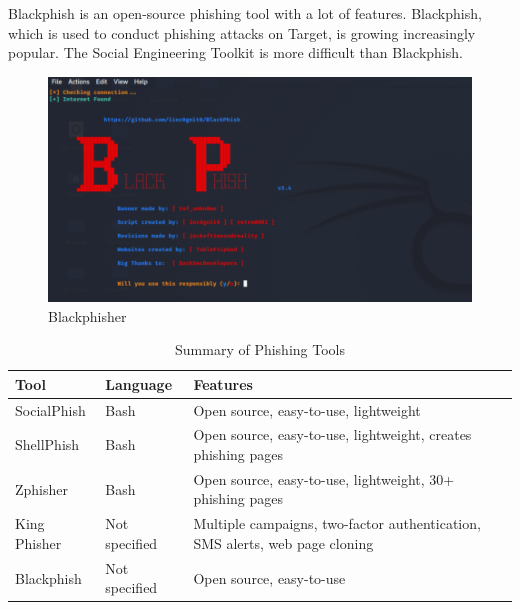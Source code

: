 \documentclass[openany]{report}
\begin{document}
Blackphish is an open-source phishing tool with a lot of features. Blackphish, which is used to conduct phishing attacks on Target, is growing increasingly popular. The Social Engineering Toolkit is more difficult than Blackphish.

\begin{figure}[H]
    \centering
    \includegraphics[width=.95\textwidth]{blackphisher.png}
    \caption{Blackphisher}
    \label{fig:blackphisher}
\end{figure}

\begin{table}[h]
    \centering
    \begin{tabular}{|l|l|l|}
        \hline
        \textbf{Tool} & \textbf{Language} & \textbf{Features}                                                           \\
        \hline
        SocialPhish   & Bash              & Open source, easy-to-use, lightweight                                       \\
        \hline
        ShellPhish    & Bash              & Open source, easy-to-use, lightweight, creates phishing pages               \\
        \hline
        Zphisher      & Bash              & Open source, easy-to-use, lightweight, 30+ phishing pages                   \\
        \hline
        King Phisher  & Not specified     & Multiple campaigns, two-factor authentication, SMS alerts, web page cloning \\
        \hline
        Blackphish    & Not specified     & Open source, easy-to-use                                                    \\
        \hline
    \end{tabular}
    \caption{Summary of Phishing Tools}
    \label{tab:my_label}
\end{table}
\end{document}
